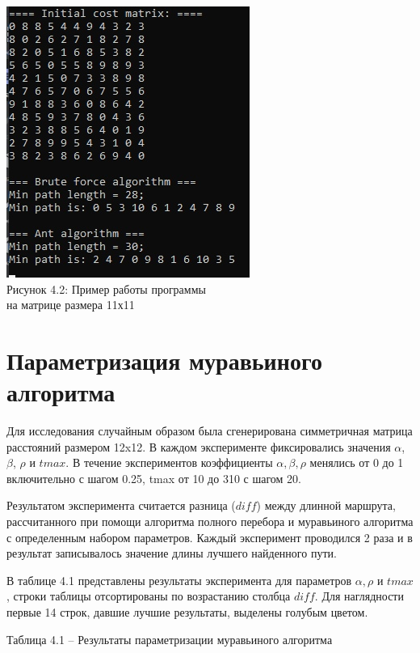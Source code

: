 \documentclass[12pt]{report}
\begin{document}
\begin{center}
	\label{img:prim2} 
	\includegraphics[scale = 0.8]{primer2} \\ Рисунок 4.2: Пример работы программы\\ на матрице размера 11х11
\end{center}	

\section{Параметризация муравьиного алгоритма}

	Для исследования случайным образом была сгенерирована симметричная матрица расстояний размером 12x12. В каждом эксперименте фиксировались значения $\alpha$, $\beta$, $\rho$ и $tmax$. В течение экспериментов коэффициенты $\alpha, \beta, \rho$ менялись от 0 до 1 включительно с шагом 0.25, tmax от 10 до 310 с шагом 20.

\hfill	

Результатом эксперимента считается разница ($diff$) между длинной маршрута, рассчитанного при помощи алгоритма полного перебора и муравьиного алгоритма с определенным набором параметров. Каждый эксперимент проводился 2 раза и в результат записывалось значение длины лучшего найденного пути.

\hfill

В таблице 4.1 представлены результаты эксперимента для параметров $\alpha, \rho$ и $tmax$, строки таблицы отсортированы по возрастанию столбца $diff$. Для наглядности первые 14 строк, давшие лучшие результаты, выделены голубым цветом.
\newpage

\begin{center}
	Таблица 4.1 -- Результаты параметризации муравьиного алгоритма
\end{center}
\end{document}
